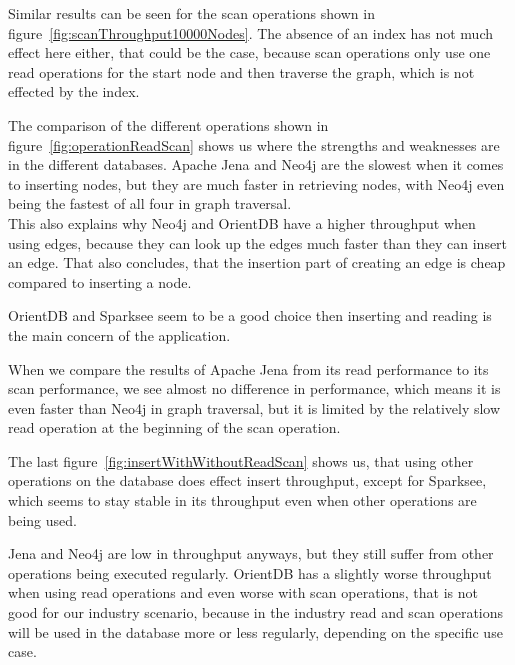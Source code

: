 Similar results can be seen for the scan operations shown in figure~\ref{fig:scanThroughput10000Nodes}.
The absence of an index has not much effect here either,
that could be the case,
because scan operations only use one read operations for the start node and then traverse the graph,
which is not effected by the index.

The comparison of the different operations shown in figure~\ref{fig:operationReadScan} shows us where the strengths and weaknesses are in the different databases.
Apache Jena and Neo4j are the slowest when it comes to inserting nodes,
but they are much faster in retrieving nodes,
with Neo4j even being the fastest of all four in graph traversal.\\
This also explains why Neo4j and OrientDB have a higher throughput when using edges,
because they can look up the edges much faster than they can insert an edge.
That also concludes,
that the insertion part of creating an edge is cheap compared to inserting a node.

OrientDB and Sparksee seem to be a good choice then inserting and reading is the main concern of the application.

When we compare the results of Apache Jena from its read performance to its scan performance,
we see almost no difference in performance,
which means it is even faster than Neo4j in graph traversal,
but it is limited by the relatively slow read operation at the beginning of the scan operation.

The last figure~\ref{fig:insertWithWithoutReadScan} shows us,
that using other operations on the database does effect insert throughput,
except for Sparksee,
which seems to stay stable in its throughput even when other operations are being used.

Jena and Neo4j are low in throughput anyways,
but they still suffer from other operations being executed regularly.
OrientDB has a slightly worse throughput when using read operations and even worse with scan operations,
that is not good for our industry scenario,
because in the industry read and scan operations will be used in the database more or less regularly,
depending on the specific use case.

